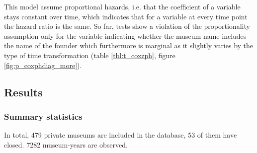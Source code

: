 \documentclass[11pt]{article}
\begin{document}
This model assume proportional hazards, i.e. that the coefficient of a variable stays constant over time, which indicates that for a variable at every time point the hazard ratio is the same.
So far, tests show a violation of the proportionality assumption only for the variable indicating whether the museum name includes the name of the founder  which furthermore is marginal as it slightly varies by the type of time transformation (table \ref{tbl:t_coxzph}, figure \ref{fig:p_coxphdiag_more}).


\subsection*{Results}


\subsubsection*{Summary statistics}


In total, 479 private museums are included in the database, 53 of them have closed.
7282 museum-years are observed.

\noindent
\end{document}
